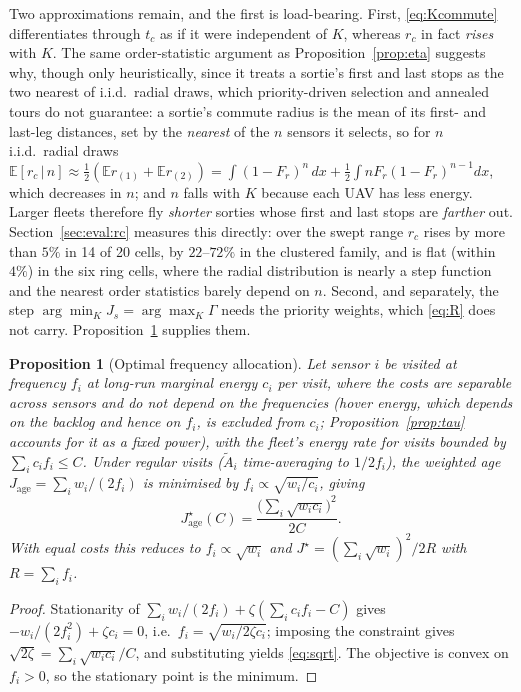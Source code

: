 \documentclass[journal,outdir=./]{IEEEtran}
\newtheorem{proposition}{Proposition}
\newcommand{\rc}{r_{c}}
\newcommand{\Gam}{\Gamma}
\begin{document}
Two approximations remain, and the first is load-bearing. First, \eqref{eq:Kcommute} differentiates through $t_c$ as if it were independent of $K$, whereas $\rc$ in fact \emph{rises} with $K$. The same order-statistic argument as Proposition~\ref{prop:eta} suggests why, though only heuristically, since it treats a sortie's first and last stops as the two nearest of i.i.d.\ radial draws, which priority-driven selection and annealed tours do not guarantee: a sortie's commute radius is the mean of its first- and last-leg distances, set by the \emph{nearest} of the $n$ sensors it selects, so for $n$ i.i.d.\ radial draws $\mathbb{E}[\rc\,|\,n]\approx\tfrac12(\mathbb{E}r_{(1)}+\mathbb{E}r_{(2)})=\int(1-F_r)^n\,dx+\tfrac12\int nF_r(1-F_r)^{n-1}dx$, which decreases in $n$; and $n$ falls with $K$ because each UAV has less energy. Larger fleets therefore fly \emph{shorter} sorties whose first and last stops are \emph{farther} out. Section~\ref{sec:eval:rc} measures this directly: over the swept range $\rc$ rises by more than $5\%$ in 14 of 20 cells, by $22$--$72\%$ in the clustered family, and is flat (within $4\%$) in the six ring cells, where the radial distribution is nearly a step function and the nearest order statistics barely depend on $n$. Second, and separately, the step $\arg\min_K J_s=\arg\max_K \Gam$ needs the priority weights, which \eqref{eq:R} does not carry. Proposition~\ref{prop:sqrt} supplies them.

\begin{proposition}[Optimal frequency allocation]\label{prop:sqrt}
Let sensor $i$ be visited at frequency $f_i$ at long-run marginal energy $c_i$ per visit, where the costs are separable across sensors and do not depend on the frequencies (hover energy, which depends on the backlog and hence on $f_i$, is excluded from $c_i$; Proposition~\ref{prop:tau} accounts for it as a fixed power), with the fleet's energy rate for visits bounded by $\sum_i c_if_i\le C$. Under regular visits ($\tilde A_i$ time-averaging to $1/2f_i$), the weighted age $J_{\mathrm{age}}=\sum_i w_i/(2f_i)$ is minimised by $f_i\propto\sqrt{w_i/c_i}$, giving
\begin{equation}\label{eq:sqrt}
J_{\mathrm{age}}^{\star}(C)=\frac{\big(\sum_i\sqrt{w_ic_i}\big)^2}{2C}.
\end{equation}
With equal costs this reduces to $f_i\propto\sqrt{w_i}$ and $J^{\star}=(\sum_i\sqrt{w_i})^2/2R$ with $R=\sum_if_i$.
\end{proposition}
\begin{proof}
Stationarity of $\sum_i w_i/(2f_i)+\zeta(\sum_i c_if_i-C)$ gives $-w_i/(2f_i^2)+\zeta c_i=0$, i.e.\ $f_i=\sqrt{w_i/2\zeta c_i}$; imposing the constraint gives $\sqrt{2\zeta}=\sum_i\sqrt{w_ic_i}/C$, and substituting yields \eqref{eq:sqrt}. The objective is convex on $f_i>0$, so the stationary point is the minimum.
\end{proof}
\end{document}
